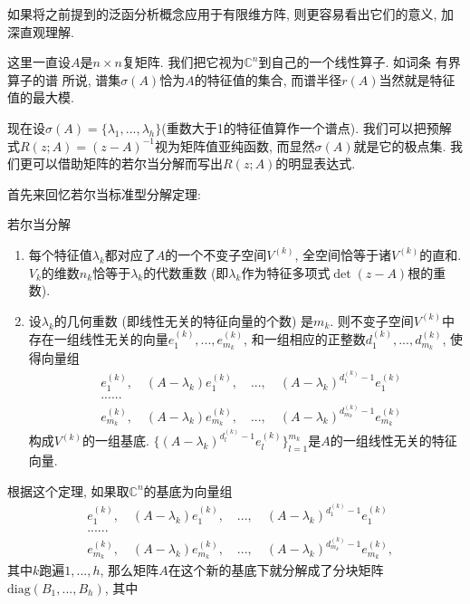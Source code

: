 

如果将之前提到的泛函分析概念应用于有限维方阵, 则更容易看出它们的意义, 加深直观理解. 

这里一直设$A$是$n\times n$复矩阵. 我们把它视为$\mathbb{C}^n$到自己的一个线性算子. 如词条 有界算子的谱 所说, 谱集$\sigma(A)$恰为$A$的特征值的集合, 而谱半径$r(A)$当然就是特征值的最大模. 

现在设$\sigma(A)=\{\lambda_1,...,\lambda_h\}$(重数大于1的特征值算作一个谱点). 我们可以把预解式$R(z;A)=(z-A)^{-1}$视为矩阵值亚纯函数, 而显然$\sigma(A)$就是它的极点集. 我们更可以借助矩阵的若尔当分解而写出$R(z;A)$的明显表达式. 

首先来回忆若尔当标准型分解定理:

\begin{theorem}{若尔当分解}
\begin{enumerate}
\item 每个特征值$\lambda_k$都对应了$A$的一个不变子空间$V^{(k)}$, 全空间恰等于诸$V^{(k)}$的直和. $V_k$的维数$n_k$恰等于$\lambda_k$的代数重数 (即$\lambda_k$作为特征多项式$\det(z-A)$根的重数).
\item 设$\lambda_k$的几何重数 (即线性无关的特征向量的个数) 是$m_k$. 则不变子空间$V^{(k)}$中存在一组线性无关的向量$e^{(k)}_1,...,e^{(k)}_{m_k}$, 和一组相应的正整数$d^{(k)}_1,...,d^{(k)}_{m_k}$, 使得向量组
$$
\begin{aligned}
&e^{(k)}_1,\quad(A-\lambda_k)e^{(k)}_1,\quad...,\quad(A-\lambda_k)^{d^{(k)}_1-1}e^{(k)}_1\\
&......\\
&e^{(k)}_{m_k},\quad(A-\lambda_k)e^{(k)}_{m_k},\quad...,\quad(A-\lambda_k)^{d^{(k)}_{m_k}-1}e^{(k)}_{m_k}
\end{aligned}
$$
构成$V^{(k)}$的一组基底. $\{(A-\lambda_k)^{d^{(k)}_l-1}e^{(k)}_l\}_{l=1}^{m_k}$是$A$的一组线性无关的特征向量.
\end{enumerate}
\end{theorem}

根据这个定理, 如果取$\mathbb{C}^n$的基底为向量组
$$
\begin{aligned}
&e^{(k)}_1,\quad(A-\lambda_k)e^{(k)}_1,\quad...,\quad(A-\lambda_k)^{d^{(k)}_1-1}e^{(k)}_1\\
&......\\
&e^{(k)}_{m_k},\quad(A-\lambda_k)e^{(k)}_{m_k},\quad...,\quad(A-\lambda_k)^{d^{(k)}_{m_k}-1}e^{(k)}_{m_k},
\end{aligned}
$$
其中$k$跑遍$1,...,h$, 那么矩阵$A$在这个新的基底下就分解成了分块矩阵$\text{diag}(B_1,...,B_h)$, 其中
